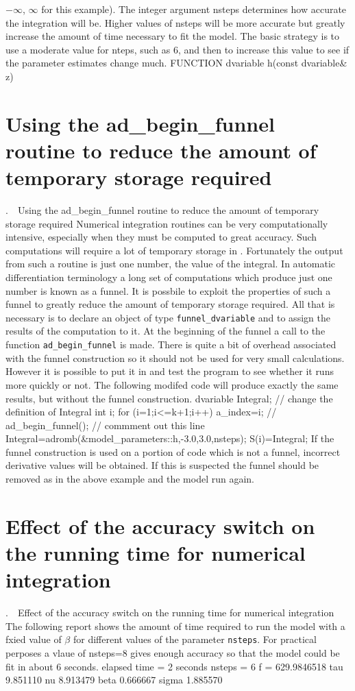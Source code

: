 \documentclass[12pt]{book}
\makeatletter
\def\mysection#1{\section{#1}{\bigbf \medbreak\noindent\number\c@chapter.\number\c@section\ \ #1\medbreak}}
\makeatother
\begin{document}
$-\infty$, $\infty$ for this example). The integer argument nsteps
determines how accurate the integration will be. Higher values of 
nsteps will be more accurate but greatly increase the amount of
time necessary to fit the model. The basic strategy is to use a moderate
value for nteps, such as 6, and then to increase this value to see
if the parameter estimates change much.
\beginexample
FUNCTION dvariable h(const dvariable& z)
\endexample
\mysection{Using the ad\_begin\_funnel routine to reduce the amount of temporary
storage required} 
Numerical integration routines can be very computationally intensive,
especially when they must be computed to great accuracy.
Such computations will require a lot of temporary storage in \ADM.
Fortunately the output from such a routine is just one number, the
value of the integral. In automatic differentiation terminology
a long set of computations which produce just one number is known
as a funnel. It is possbile to exploit the properties of such a
funnel to greatly reduce the amount of temporary storage required.
All that is necessary is to declare an object of type {\tt funnel\_dvariable}
and to assign the results of the computation to it.  At the beginning
of the funnel a call to the function {\tt ad\_begin\_funnel} is
made. There is quite a bit of overhead associated with the funnel
construction so it should not be used for very small calculations.
However it is possible to put it in and test the program to
see whether it runs more quickly or not. The following  modifed
code will produce exactly the same results, but without the funnel
construction.
\beginexample
  dvariable Integral;   // change the definition of Integral
  int i;
  for (i=1;i<=k+1;i++)
  {
    a_index=i;
    // ad_begin_funnel();  // commment out this line
    Integral=adromb(&model_parameters::h,-3.0,3.0,nsteps);
    S(i)=Integral;
  }
\endexample
If the funnel construction is used on a portion of code which is
not a funnel, incorrect derivative  values will be obtained.
If this is suspected the funnel should be removed as in the above
example and the model run again.

\mysection{Effect of the accuracy switch on the running time for
numerical integration}
The following report shows the amount of time required to run the model
with a fxied value of $\beta$ for different values of the
parameter {\tt nsteps}. For practical perposes a vlaue of nsteps=8
gives enough accuracy so that the model could be fit in about 6 seconds.
\beginexample
elapsed time = 2 seconds nsteps = 6 f = 629.9846518
tau 9.851110 nu 8.913479 beta 0.666667 sigma 1.885570
\end{document}
